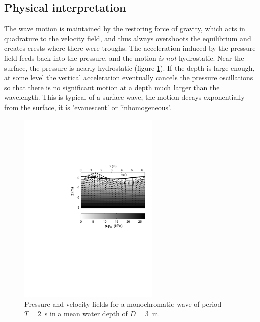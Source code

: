 \subsection{Physical interpretation}
The wave motion is maintained by the restoring force of gravity, which acts in quadrature to the velocity field, 
and thus always overshoots the equilibrium and creates crests where there were troughs. 
The acceleration induced by the pressure field feeds back into the pressure, and the motion \emph{is not} hydrostatic. 
Near the surface, the pressure is nearly hydrostatic (figure \ref{fig:puv1}). If the depth is large enough, 
at some level the vertical acceleration eventually cancels the pressure oscillations so that there is no 
significant motion at a depth much larger than the wavelength. This is typical of a surface wave, the motion decays exponentially 
from the surface, it is 'evanescent' or 'inhomogeneous'. 
\begin{figure}
\centerline{\includegraphics[width=0.6\textwidth]{FIGS_CH_AIRY/2sec_3mdepth_ppuv_1.pdf}}
  \caption{Pressure and velocity fields for a monochromatic wave of 
period $T=2$~s in a mean water depth of  $D=3$~m.}
\label{fig:puv1}
\end{figure}

